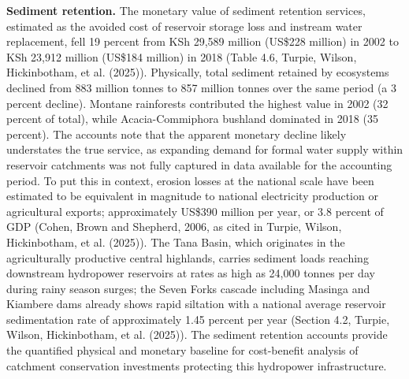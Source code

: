 \documentclass[
  letterpaper,
  DIV=11,
  numbers=noendperiod]{scrartcl}
\begin{document}
\textbf{Sediment retention.} The monetary value of sediment retention
services, estimated as the avoided cost of reservoir storage loss and
instream water replacement, fell 19 percent from KSh 29,589 million
(US\$228 million) in 2002 to KSh 23,912 million (US\$184 million) in
2018 (Table 4.6, Turpie, Wilson, Hickinbotham, et al. (2025)).
Physically, total sediment retained by ecosystems declined from 883
million tonnes to 857 million tonnes over the same period (a 3 percent
decline). Montane rainforests contributed the highest value in 2002 (32
percent of total), while Acacia-Commiphora bushland dominated in 2018
(35 percent). The accounts note that the apparent monetary decline
likely understates the true service, as expanding demand for formal
water supply within reservoir catchments was not fully captured in data
available for the accounting period. To put this in context, erosion
losses at the national scale have been estimated to be equivalent in
magnitude to national electricity production or agricultural exports;
approximately US\$390 million per year, or 3.8 percent of GDP (Cohen,
Brown and Shepherd, 2006, as cited in Turpie, Wilson, Hickinbotham, et
al. (2025)). The Tana Basin, which originates in the agriculturally
productive central highlands, carries sediment loads reaching downstream
hydropower reservoirs at rates as high as 24,000 tonnes per day during
rainy season surges; the Seven Forks cascade including Masinga and
Kiambere dams already shows rapid siltation with a national average
reservoir sedimentation rate of approximately 1.45 percent per year
(Section 4.2, Turpie, Wilson, Hickinbotham, et al. (2025)). The sediment
retention accounts provide the quantified physical and monetary baseline
for cost-benefit analysis of catchment conservation investments
protecting this hydropower infrastructure.
\end{document}
